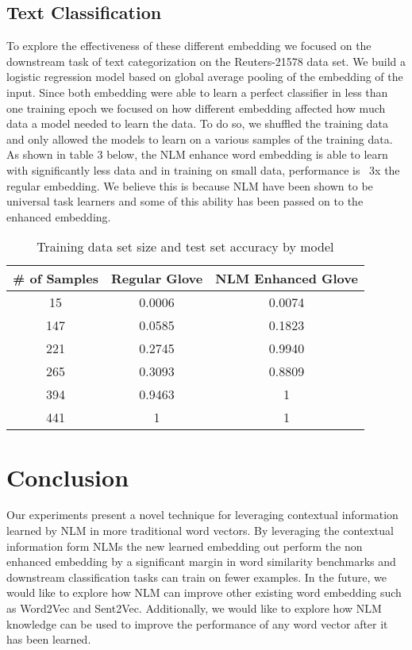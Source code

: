 \documentclass[11pt]{article}
\begin{document}
\subsection{Text Classification}
To explore the effectiveness of these different embedding we focused on the downstream task of text categorization on the Reuters-21578 data set. We build a logistic regression model based on global average pooling of the embedding of the input. Since both embedding were able to learn a perfect classifier in less than one training epoch we focused on how different embedding affected how much data a model needed to learn the data. To do so, we shuffled the training data and only allowed the models to learn on a various samples of the training data. As shown in table 3 below, the NLM enhance word embedding is able to learn with significantly less data and in training on small data, performance is ~3x the regular embedding. We believe this is because NLM have been shown to be universal task learners and some of this ability has been passed on to the enhanced embedding.
\begin{table}[h]
\centering
\caption{Training data set size and test set accuracy by model}
\label{table3}
\begin{tabular}{|c|c|c|} \hline
 \# of Samples & Regular Glove & NLM Enhanced Glove\\ \hline
  15 & 0.0006    & 0.0074 \\ \hline
  147 & 0.0585  & 0.1823  \\ \hline
  221 & 0.2745  & 0.9940 \\ \hline
  265 & 0.3093    & 0.8809  \\ \hline
  394& 0.9463   & 1 \\ \hline
  441 & 1   & 1 \\ \hline    
\end{tabular}
\end{table} 
\section{Conclusion}
Our experiments present a novel technique for leveraging contextual information learned by NLM in more traditional word vectors. By leveraging the contextual information form NLMs the new learned embedding out perform the non enhanced embedding by a significant margin in word similarity benchmarks and downstream classification tasks can train on fewer examples. In the future, we would like to explore how NLM can improve other existing word embedding such as Word2Vec and Sent2Vec. Additionally, we would like to explore how NLM knowledge can be used to improve the performance of any word vector after it has been learned. 
\end{document}
